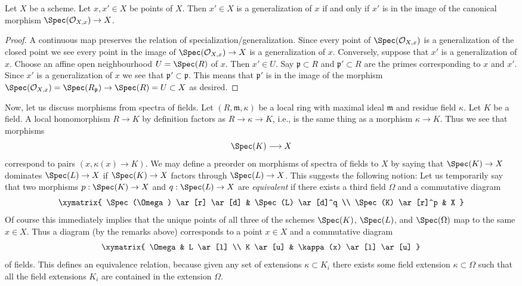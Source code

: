 \begin{lemma}
\label{lemma-specialize-points}
Let $X$ be a scheme.
Let $x, x' \in X$ be points of $X$.
Then $x' \in X$ is a generalization of $x$ if and only if
$x'$ is in the image of the canonical morphism
$\Spec(\mathcal{O}_{X, x}) \to X$.
\end{lemma}

\begin{proof}
A continuous map preserves the relation of specialization/generalization.
Since every point of $\Spec(\mathcal{O}_{X, x})$ is a
generalization of the closed point we see every point in the image
of $\Spec(\mathcal{O}_{X, x}) \to X$ is a generalization of $x$.
Conversely, suppose that $x'$ is a generalization of $x$.
Choose an affine open neighbourhood $U = \Spec(R)$ of
$x$. Then $x' \in U$. Say $\mathfrak p \subset R$ and
$\mathfrak p' \subset R$ are the primes corresponding
to $x$ and $x'$. Since $x'$ is a generalization of $x$
we see that $\mathfrak p' \subset \mathfrak p$. This means
that $\mathfrak p'$ is in the image of the morphism
$\Spec(\mathcal{O}_{X, x}) = \Spec(R_{\mathfrak p})
\to \Spec(R) = U \subset X$ as desired.
\end{proof}

\noindent
Now, let us discuss morphisms from spectra of fields.
Let $(R, \mathfrak m, \kappa)$ be a local ring
with maximal ideal $\mathfrak m$ and residue field $\kappa$.
Let $K$ be a field. A local homomorphism $R \to K$ by definition
factors as $R \to \kappa \to K$, i.e., is the same thing as
a morphism $\kappa \to K$. Thus we see that morphisms
$$
\Spec(K) \longrightarrow X
$$
correspond to pairs $(x, \kappa(x) \to K)$. We may define
a preorder on morphisms of spectra of fields to $X$
by saying that $\Spec(K) \to X$ dominates
$\Spec(L) \to X$ if $\Spec(K) \to X$
factors through $\Spec(L) \to X$. This suggests
the following notion: Let us temporarily
say that two morphisms $p : \Spec(K) \to X$ and
$q : \Spec(L) \to X$ are {\it equivalent} if there exists
a third field $\Omega$ and a commutative diagram
$$
\xymatrix{
\Spec(\Omega) \ar[r] \ar[d] &
\Spec(L) \ar[d]^q \\
\Spec(K) \ar[r]^p &
X
}
$$
Of course this immediately implies that the unique points of
all three of the schemes $\Spec(K)$,
$\Spec(L)$, and $\Spec(\Omega)$
map to the same $x \in X$. Thus a diagram (by the remarks above)
corresponds to a point $x \in X$ and a commutative diagram
$$
\xymatrix{
\Omega &
L \ar[l] \\
K \ar[u] &
\kappa(x) \ar[l] \ar[u]
}
$$
of fields. This defines an equivalence relation, because given
any set of extensions $\kappa \subset K_i$ there exists
some field extension $\kappa \subset \Omega$ such that all
the field extensions $K_i$ are contained in the extension $\Omega$.

